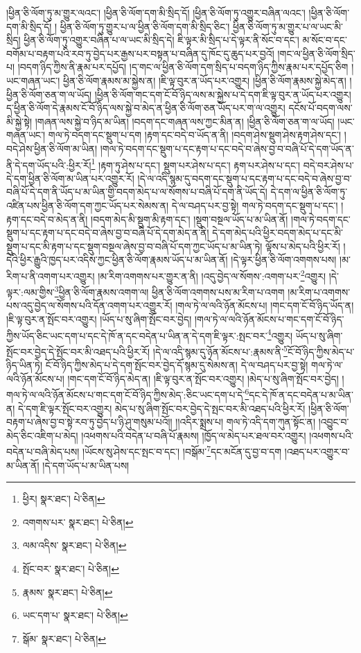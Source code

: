 །ཕྱིན་ཅི་ལོག་ཏུ་མ་གྱུར་ལའང་། །ཕྱིན་ཅི་ལོག་དག་མི་སྲིད་དོ། །ཕྱིན་ཅི་ལོག་ཏུ་འགྱུར་བཞིན་ལའང་། །ཕྱིན་ཅི་ལོག་དག་མི་སྲིད་དོ། །
ཕྱིན་ཅི་ལོག་ཏུ་གྱུར་པ་ལ་ཕྱིན་ཅི་ལོག་དག་མི་སྲིད་ཅིང་། ཕྱིན་ཅི་ལོག་ཏུ་མ་གྱུར་པ་ལ་ཡང་མི་སྲིད། ཕྱིན་ཅི་ལོག་ཏུ་འགྱུར་བཞིན་པ་ལ་ཡང་མི་སྲིད་དེ། ཇི་ལྟར་མི་སྲིད་པ་དེ་ལྟར་ནི་སོང་བ་དང་། མ་སོང་བ་དང་བགོམ་པ་བརྟག་པའི་རབ་ཏུ་བྱེད་པར་རྒྱས་པར་བསྟན་པ་བཞིན་དུ་ཁོང་དུ་ཆུད་པར་བྱའོ། །གང་ལ་ཕྱིན་ཅི་ལོག་སྲིད་པ། །བདག་ཉིད་ཀྱིས་ནི་རྣམ་པར་དཔྱོད། །ད་གང་ལ་ཕྱིན་ཅི་ལོག་དག་སྲིད་པ་བདག་ཉིད་ཀྱིས་རྣམ་པར་དཔྱོད་ཅིག །ཡང་གཞན་ཡང་། ཕྱིན་ཅི་ལོག་རྣམས་མ་སྐྱེས་ན། །ཇི་ལྟ་བུར་ན་ཡོད་པར་འགྱུར། །ཕྱིན་ཅི་ལོག་རྣམས་སྐྱེ་མེད་ན། །ཕྱིན་ཅི་ལོག་ཅན་ག་ལ་ཡོད། །ཕྱིན་ཅི་ལོག་གང་དག་ངོ་བོ་ཉིད་ལས་མ་སྐྱེས་པ་དེ་དག་ཇི་ལྟ་བུར་ན་ཡོད་པར་འགྱུར། ད་ཕྱིན་ཅི་ལོག་དེ་རྣམས་ངོ་བོ་ཉིད་ལས་སྐྱེ་བ་མེད་ན་ཕྱིན་ཅི་ལོག་ཅན་ཡོད་པར་ག་ལ་འགྱུར། དངོས་པོ་བདག་ལས་མི་སྐྱེ་སྟེ། །གཞན་ལས་སྐྱེ་བ་ཉིད་མ་ཡིན། །བདག་དང་གཞན་ལས་ཀྱང་མིན་ན། །ཕྱིན་ཅི་ལོག་ཅན་ག་ལ་ཡོད། །ཡང་གཞན་ཡང་། གལ་ཏེ་བདག་དང་སྡུག་པ་དག །རྟག་དང་བདེ་བ་ཡོད་ན་ནི། །བདག་ཤེས་སྡུག་ཤེས་རྟག་ཤེས་དང་། །བདེ་ཤེས་ཕྱིན་ཅི་ལོག་མ་ཡིན། །གལ་ཏེ་བདག་དང་སྡུག་པ་དང་རྟག་པ་དང་བདེ་བ་ཞེས་བྱ་བ་བཞི་པོ་དེ་དག་ཡོད་ན་ནི་དེ་དག་ཡོད་པའི་:ཕྱིར་རོ།\footnote{ཕྱིར།  སྣར་ཐང་།  པེ་ཅིན། } །རྟག་ཏུ་ཤེས་པ་དང་། སྡུག་པར་ཤེས་པ་དང་། རྟག་པར་ཤེས་པ་དང་། བདེ་བར་ཤེས་པ་དེ་དག་ཕྱིན་ཅི་ལོག་མ་ཡིན་པར་འགྱུར་རོ། །དེ་ལ་འདི་སྙམ་དུ་བདག་དང་སྡུག་པ་དང་རྟག་པ་དང་བདེ་བ་ཞེས་བྱ་བ་བཞི་པོ་དེ་དག་ནི་ཡོད་པ་མ་ཡིན་གྱི་བདག་མེད་པ་ལ་སོགས་པ་བཞི་པོ་དག་ནི་ཡོད་དེ། དེ་དག་ལ་ཕྱིན་ཅི་ལོག་ཏུ་འཛིན་པས་ཕྱིན་ཅི་ལོག་དག་ཀྱང་ཡོད་པར་སེམས་ན། དེ་ལ་བཤད་པར་བྱ་སྟེ། གལ་ཏེ་བདག་དང་སྡུག་པ་དང་། །རྟག་དང་བདེ་བ་མེད་ན་ནི། །བདག་མེད་མི་སྡུག་མི་རྟག་དང་། །སྡུག་བསྔལ་ཡོད་པ་མ་ཡིན་ནོ། །གལ་ཏེ་བདག་དང་སྡུག་པ་དང་རྟག་པ་དང་བདེ་བ་ཞེས་བྱ་བ་བཞི་པོ་དེ་དག་མེད་ན་ནི། དེ་དག་མེད་པའི་ཕྱིར་བདག་མེད་པ་དང་མི་སྡུག་པ་དང་མི་རྟག་པ་དང་སྡུག་བསྔལ་ཞེས་བྱ་བ་བཞི་པོ་དག་ཀྱང་ཡོད་པ་མ་ཡིན་ཏེ། ལྟོས་པ་མེད་པའི་ཕྱིར་རོ། །དེའི་ཕྱིར་རྒྱུའི་ཁྱད་པར་འདིས་ཀྱང་ཕྱིན་ཅི་ལོག་རྣམས་ཡོད་པ་མ་ཡིན་ནོ། །དེ་ལྟར་ཕྱིན་ཅི་ལོག་འགགས་པས། །མ་རིག་པ་ནི་འགག་པར་འགྱུར། །མ་རིག་འགགས་པར་གྱུར་ན་ནི། །འདུ་བྱེད་ལ་སོགས་:འགག་པར་\footnote{འགགས་པར་  སྣར་ཐང་།  པེ་ཅིན། }འགྱུར། །དེ་ལྟར་:ལམ་གྱིས་\footnote{ལམ་འདིས་  སྣར་ཐང་།  པེ་ཅིན། }ཕྱིན་ཅི་ལོག་རྣམས་འགག་ལ། ཕྱིན་ཅི་ལོག་འགགས་པས་མ་རིག་པ་འགག །མ་རིག་པ་འགགས་པས་འདུ་བྱེད་ལ་སོགས་པའི་དོན་འགག་པར་འགྱུར་རོ། །གལ་ཏེ་ལ་ལའི་ཉོན་མོངས་པ། །གང་དག་ངོ་བོ་ཉིད་ཡོད་ན། །ཇི་ལྟ་བུར་ན་སྤོང་བར་འགྱུར། །ཡོད་པ་སུ་ཞིག་སྤོང་བར་བྱེད། །གལ་ཏེ་ལ་ལའི་ཉོན་མོངས་པ་གང་དག་ངོ་བོ་ཉིད་ཀྱིས་ཡོད་ཅིང་ཡང་དག་པ་དང་དེ་ཁོ་ན་དང་བདེན་པ་ཡིན་ན་དེ་དག་ཇི་ལྟར་:སྤང་བར་\footnote{སྤོང་བར་  སྣར་ཐང་།  པེ་ཅིན། }འགྱུར། ཡོད་པ་སུ་ཞིག་སྤོང་བར་བྱེད་དེ་སྤོང་བར་མི་འཐད་པའི་ཕྱིར་རོ། །དེ་ལ་འདི་སྙམ་དུ་ཉོན་མོངས་པ་:རྣམས་ནི་\footnote{རྣམས་  སྣར་ཐང་།  པེ་ཅིན། }ངོ་བོ་ཉིད་ཀྱིས་མེད་པ་ཉིད་ཡིན་ཏེ། ངོ་བོ་ཉིད་ཀྱིས་མེད་པ་དེ་དག་སྤོང་བར་བྱེད་དོ་སྙམ་དུ་སེམས་ན། དེ་ལ་བཤད་པར་བྱ་སྟེ། གལ་ཏེ་ལ་ལའི་ཉོན་མོངས་པ། །གང་དག་ངོ་བོ་ཉིད་མེད་ན། །ཇི་ལྟ་བུར་ན་སྤོང་བར་འགྱུར། །མེད་པ་སུ་ཞིག་སྤོང་བར་བྱེད། །གལ་ཏེ་ལ་ལའི་ཉོན་མོངས་པ་གང་དག་ངོ་བོ་ཉིད་ཀྱིས་མེད་:ཅིང་ཡང་དག་པ་དེ་\footnote{ཡང་དག་པ་  སྣར་ཐང་།  པེ་ཅིན། }དང་དེ་ཁོ་ན་དང་བདེན་པ་མ་ཡིན་ན། དེ་དག་ཇི་ལྟར་སྤོང་བར་འགྱུར། མེད་པ་སུ་ཞིག་སྤོང་བར་བྱེད་དེ་སྤང་བར་མི་འཐད་པའི་ཕྱིར་རོ། །ཕྱིན་ཅི་ལོག་བརྟག་པ་ཞེས་བྱ་བ་སྟེ་རབ་ཏུ་བྱེད་པ་ཉི་ཤུ་གསུམ་པའོ།། །།འདིར་སྨྲས་པ། གལ་ཏེ་འདི་དག་ཀུན་སྟོང་ན། །འབྱུང་བ་མེད་ཅིང་འཇིག་པ་མེད། །འཕགས་པའི་བདེན་པ་བཞི་པོ་རྣམས། །ཁྱོད་ལ་མེད་པར་ཐལ་བར་འགྱུར། །འཕགས་པའི་བདེན་པ་བཞི་མེད་པས། །ཡོངས་སུ་ཤེས་དང་སྤང་བ་དང་། །བསྒོམ་\footnote{སྒོམ་  སྣར་ཐང་།  པེ་ཅིན། }དང་མངོན་དུ་བྱ་བ་དག །འཐད་པར་འགྱུར་བ་མ་ཡིན་ནོ། །དེ་དག་ཡོད་པ་མ་ཡིན་པས། 